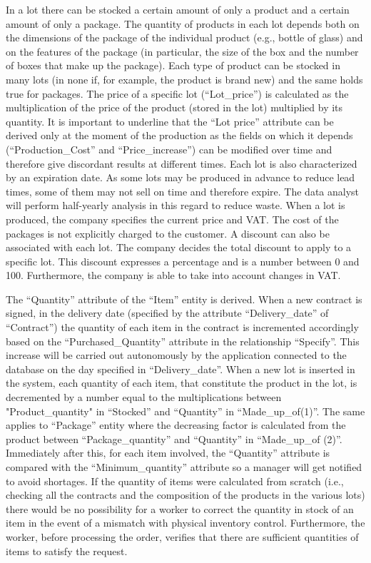 In a lot there can be stocked a certain amount of only a product and a certain amount of only a package. The quantity of products in each lot depends both on the dimensions of the package of the individual product (e.g., bottle of glass) and on the features of the package (in particular, the size of the box and the number of boxes that make up the package). Each type of product can be stocked in many lots (in none if, for example, the product is brand new) and the same holds true for packages. The price of a specific lot (``Lot\_price'') is calculated as the multiplication of the price of the product (stored in the lot) multiplied by its quantity. It is important to underline that the ``Lot price'' attribute can be derived only at the moment of the production as the fields on which it depends (``Production\_Cost'' and ``Price\_increase'') can be modified over time and therefore give discordant results at different times. Each lot is also characterized by an expiration date. As some lots may be produced in advance to reduce lead times, some of them may not sell on time and therefore expire. The data analyst will perform half-yearly analysis in this regard to reduce waste. When a lot is produced, the company specifies the current price and VAT. The cost of the packages is not explicitly charged to the customer. A discount can also be associated with each lot. The company decides the total discount to apply to a specific lot. This discount expresses a percentage and is a number between 0 and 100. Furthermore, the company is able to take into account changes in VAT.

The ``Quantity'' attribute of the ``Item'' entity is derived. When a new contract is signed, in the delivery date (specified by the attribute ``Delivery\_date'' of ``Contract'') the quantity of each item in the contract is incremented accordingly based on the ``Purchased\_Quantity'' attribute in the relationship ``Specify''. This increase will be carried out autonomously by the application connected to the database on the day specified in ``Delivery\_date''. When a new lot is inserted in the system, each quantity of each item, that constitute the product in the lot, is decremented by a number equal to the multiplications between "Product\_quantity" in ``Stocked'' and ``Quantity'' in ``Made\_up\_of(1)''. The same applies to ``Package'' entity where the decreasing factor is calculated from the product between ``Package\_quantity'' and ``Quantity'' in ``Made\_up\_of (2)''. Immediately after this, for each item involved, the ``Quantity'' attribute is compared with the ``Minimum\_quantity'' attribute so a manager will get notified to avoid shortages. If the quantity of items were calculated from scratch (i.e., checking all the contracts and the composition of the products in the various lots) there would be no possibility for a worker to correct the quantity in stock of an item in the event of a mismatch with physical inventory control. Furthermore, the worker, before processing the order, verifies that there are sufficient quantities of items to satisfy the request.

